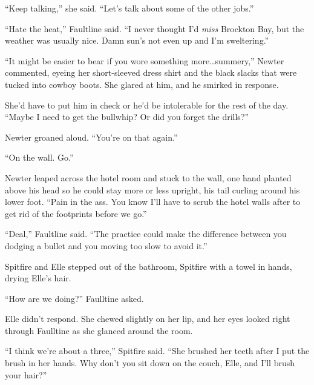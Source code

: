 ``Keep talking,'' she said.  ``Let's talk about some of the other jobs.''



\blacksquare



``Hate the heat,'' Faultline said.  ``I never thought I'd \emph{miss} Brockton Bay, but the weather was usually nice.  Damn sun's not even up and I'm sweltering.''



``It might be easier to bear if you wore something more\ldots summery,'' Newter commented, eyeing her short-sleeved dress shirt and the black slacks that were tucked into cowboy boots.  She glared at him, and he smirked in response.



She'd have to put him in check or he'd be intolerable for the rest of the day.  ``Maybe I need to get the bullwhip?  Or did you forget the drills?''



Newter groaned aloud.  ``You're on that again.''



``On the wall.  Go.''



Newter leaped across the hotel room and stuck to the wall, one hand planted above his head so he could stay more or less upright, his tail curling around his lower foot.  ``Pain in the ass.  You know I'll have to scrub the hotel walls after to get rid of the footprints before we go.''



``Deal,'' Faultline said.  ``The practice could make the difference between you dodging a bullet and you moving too slow to avoid it.''



Spitfire and Elle stepped out of the bathroom, Spitfire with a towel in hands, drying Elle's hair.



``How are we doing?'' Faulltine asked.



Elle didn't respond.  She chewed slightly on her lip, and her eyes looked right through Faulltine as she glanced around the room.



``I think we're about a three,'' Spitfire said.  ``She brushed her teeth after I put the brush in her hands.  Why don't you sit down on the couch, Elle, and I'll brush your hair?''



